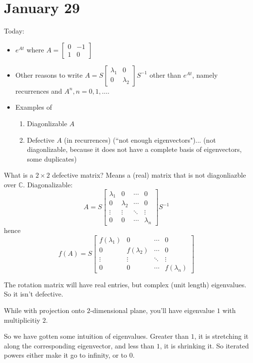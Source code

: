 \documentclass{article}
\theoremstyle{plain}
\theoremstyle{remark}
\newcommand{\C}{{\mathbb C}}
\begin{document}
\section{January 29}
Today:
\begin{itemize}
	\item $e^{At}$ where $A = \begin{bmatrix} 0 & -1 \\ 1 & 0 \end{bmatrix}$
	\item Other reasons to write $A =
		S\begin{bmatrix} \lambda_1 & 0 \\ 0 & \lambda_2\end{bmatrix}S^{-1}$
		other than $e^{At}$, namely recurrences and $A^n, n=0,1,\dots$.
	\item Examples of
		\begin{enumerate}
			\item Diagonlizable $A$
			\item Defective $A$ (in recurrences) (``not enough eigenvectors")...
				(not diagonlizable, because it does not have a
				complete basis of eigenvectors, some duplicates)
		\end{enumerate}
\end{itemize}

What is a $2 \times 2$ defective matrix?
Means a (real) matrix that is not diagonliazble over $\C$.
Diagonalizable:
\[
	A = S\begin{bmatrix} \lambda_1 & 0 & \cdots & 0\\
		0 & \lambda_2 & \cdots & 0\\
		\vdots & \vdots & \ddots & \vdots\\
	0 & 0 & \cdots & \lambda_n\end{bmatrix}
	S^{-1}
\]
hence
\[
	f(A) = S\begin{bmatrix} f(\lambda_1) & 0 & \cdots & 0\\
		0 & f(\lambda_2) & \cdots & 0\\
		\vdots & \vdots & \ddots & \vdots\\
	0 & 0 & \cdots & f(\lambda_n)\end{bmatrix}
\]

The rotation matrix will have real entries,
but complex (unit length) eigenvalues.
So it isn't defective.

While with projection onto $2$-dimensional plane,
you'll have eigenvalue $1$ with multiplicitiy $2$.

So we have gotten some intuition of eigenvalues.
Greater than $1$, it is stretching it along the corresponding eigenvector,
and less than $1$, it is shrinking it.
So iterated powers either make it go to infinity, or to $0$.
\end{document}
